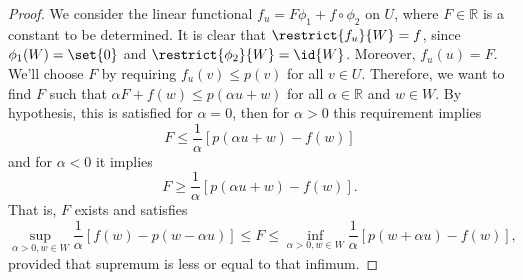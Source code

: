 \begin{proof}
    We consider the linear functional \(f_u = F\phi_1 + f\circ\phi_2\) on \(U\), where \(F\in \mathbb{R}\) is a constant to be determined. It is clear that \(\restrict{f_u}{W} = f\), since \(\phi_1(W) = \set{0}\) and \(\restrict{\phi_2}{W} = \id{W}\). Moreover, \(f_u(u) = F\). We'll choose \(F\) by requiring \(f_u(v) \leq p(v)\) for all \(v \in U\). Therefore, we want to find \(F\) such that \(\alpha F + f(w) \leq p(\alpha u + w)\) for all \(\alpha \in \mathbb{R}\) and \(w \in W\). By hypothesis, this is satisfied for \(\alpha = 0\), then for \(\alpha > 0\) this requirement implies
    \begin{equation*}
        F \leq \frac1\alpha \left[p(\alpha u + w) - f(w)\right]
    \end{equation*}
    and for \(\alpha < 0\) it implies
    \begin{equation*}
        F \geq \frac1\alpha \left[p(\alpha u + w) - f(w)\right].
    \end{equation*}
    That is, \(F\) exists and satisfies
    \begin{equation*}
        \sup_{\alpha > 0, w \in W} \frac{1}{\alpha}\left[f(w) - p(w - \alpha u)\right] \leq F \leq \inf_{\alpha > 0, w \in W} \frac{1}{\alpha}\left[p(w + \alpha u) - f(w)\right],
    \end{equation*}
    provided that supremum is less or equal to that infimum.


\end{proof}
